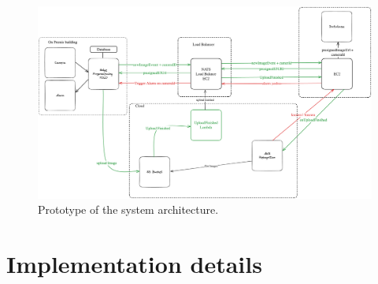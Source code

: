 \documentclass[conference]{IEEEtran}
\begin{document}
\begin{figure}[h!]
      \centering
      \includegraphics[width=1\linewidth]{images/architecturev2.excalidraw.png}
      \caption{Prototype of the system architecture.}
      \label{fig:enter-label}
\end{figure}

\section{Implementation details}
\end{document}
